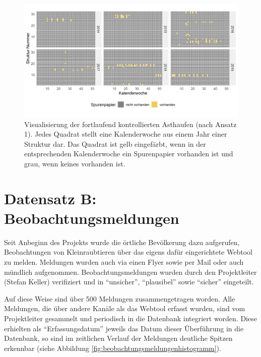 \documentclass[
  oneside]{scrbook}
\begin{document}
\begin{figure}
\includegraphics[width=1\linewidth]{images/wirkungskontrolle_spontan_effort} \caption{Visualisierung der fortlaufend kontrollierten Asthaufen (nach Ansatz 1). Jedes Quadrat stellt eine Kalenderwoche aus einem Jahr einer Struktur dar. Das Quadrat ist gelb eingefärbt, wenn in der entsprechenden Kalenderwoche ein Spurenpapier vorhanden ist und grau, wenn keines vorhanden ist.}\label{fig:wirkungskontrollespontaneffort}
\end{figure}

\hypertarget{methode-datensatz-b}{%
\section{Datensatz B: Beobachtungsmeldungen}\label{methode-datensatz-b}}

Seit Anbeginn des Projekts wurde die örtliche Bevölkerung dazu aufgerufen, Beobachtungen von Kleinraubtieren über das eigens dafür eingerichtete Webtool zu melden. Meldungen wurden auch via einen Flyer sowie per Mail oder auch mündlich aufgenommen. Beobachtungsmeldungen wurden durch den Projektleiter (Stefan Keller) verifiziert und in ``unsicher'', ``plausibel'' sowie ``sicher'' eingeteilt.

Auf diese Weise sind über 500 Meldungen zusammengetragen worden. Alle Meldungen, die über andere Kanäle als das Webtool erfasst wurden, sind vom Projektleiter gesammelt und periodisch in die Datenbank integriert worden. Diese erhielten als ``Erfassungsdatum'' jeweils das Datum dieser Überführung in die Datenbank, so sind im zeitlichen Verlauf der Meldungen deutliche Spitzen erkennbar (siehe Abbildung \ref{fig:beobachtungsmeldungenhistogramm}).
\end{document}
